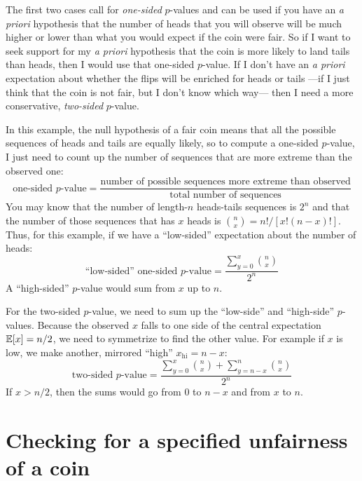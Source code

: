 The first two cases call for \emph{one-sided} $p$-values and can be used if you
have an \textit{a priori} hypothesis that the number of heads that you will
observe will be much higher or lower than what you would expect if the coin
were fair. So if I want to seek support for my \textit{a priori} hypothesis
that the coin is more likely to land tails than heads, then I would use that
one-sided $p$-value. If I don't have an \textit{a priori} expectation about
whether the flips will be enriched for heads or tails ---if I just think that
the coin is not fair, but I don't know which way--- then I need a more
conservative, \emph{two-sided} $p$-value.

In this example, the null hypothesis of a fair coin means that all the possible
sequences of heads and tails are equally likely, so to compute a one-sided
$p$-value, I just need to count up the number of sequences that are more
extreme than the observed one:
\begin{equation}
    \text{one-sided $p$-value} = \frac{\text{number of possible sequences more extreme than observed}}{\text{total number of sequences}}
\end{equation}
You may know that the number of length-$n$ heads-tails sequences is $2^n$ and
that the number of those sequences that has $x$ heads is $\binom{n}{x} = n! /
\left[ x! (n-x)! \right]$. Thus, for this example, if we have a ``low-sided''
expectation about the number of heads:
\begin{equation}
    \text{``low-sided'' one-sided $p$-value} = \frac{\sum_{y=0}^x \binom{n}{x}}{2^n}
\end{equation}
A ``high-sided'' $p$-value would sum from $x$ up to $n$.

For the two-sided $p$-value, we need to sum up the ``low-side'' and ``high-side'' $p$-values. Because the observed $x$ falls to one side of the central expectation $\mathbb{E}\!\left[{x}\right] = n/2$, we need to symmetrize to find the other value. For example if $x$ is low, we make another, mirrored ``high'' $x_\mathrm{hi} = n-x$:
\begin{equation}
    \text{two-sided $p$-value} = \frac{\sum_{y=0}^x \binom{n}{x} + \sum_{y=n-x}^n \binom{n}{x}}{2^n}
\end{equation}
If $x > n/2$, then the sums would go from $0$ to $n-x$ and from $x$ to $n$.

\section{Checking for a specified unfairness of a coin}


